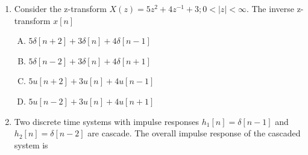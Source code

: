 \documentclass[journal,12pt,twocolumn]{IEEEtran}
\begin{document}
\begin{enumerate}
%
%
%
%
%
%
%
%
%

\item Consider the z-transform $X(z)=5z^{2}+4z^{-1}+3;0<|z|<\infty$. The inverse z-transform $x[n]$

\begin{enumerate}[(A)]

\setlength\itemsep{1em}

\item $5\delta[n+2]+3\delta[n]+4\delta[n-1]$
\item $5\delta[n-2]+3\delta[n]+4\delta[n+1]$
\item $5u[n+2]+3u[n]+4u[n-1]$
\item $5u[n-2]+3u[n]+4u[n+1]$

\end{enumerate}

\item Two discrete time systems with impulse responses $h_1[n]=\delta[n-1]$ and $h_2[n]=\delta[n-2]$ are cascade. The overall impulse response of the cascaded system is

\begin{enumerate}[(A)]
\begin{multicols}{2}
\setlength\itemsep{1em}


\end{multicols}
\end{enumerate}
\end{enumerate}
\end{document}
